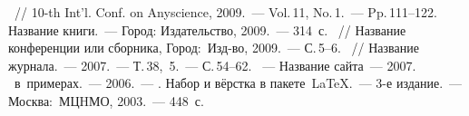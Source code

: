 \documentclass[10pt]{article}
\begin{document}
\begin{thebibliography}{1}
    ~//
    10-th Int'l. Conf. on Anyscience, 2009.~--- Vol.\,11, No.\,1.~--- Pp.\,111--122.
    Название книги.~---
    Город: Издательство, 2009.~--- 314~с.
    ~//
    Название конференции или сборника,
    Город:~Изд-во, 2009.~--- С.\,5--6.
    ~//
    Название журнала.~--- 2007.~--- Т.\,38, \No\,5.~--- С.\,54--62.
    ~---
    Название сайта~--- 2007.
    \LaTeXe\ в~примерах.~---
    2006.~---
    .
     Набор и вёрстка в пакете~\LaTeX.~---
    3-е издание.~---
    Москва:~МЦHМО, 2003.~--- 448~с.
\end{thebibliography}
\end{document}
